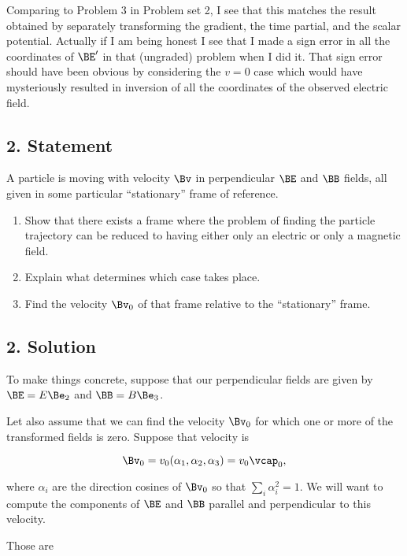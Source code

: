 Comparing to Problem 3 in Problem set 2, I see that this matches the result obtained by separately transforming the gradient, the time partial, and the scalar potential.  Actually if I am being honest I see that I made a sign error in all the coordinates of $\BE'$ in that (ungraded) problem when I did it.  That sign error should have been obvious by considering the $v=0$ case which would have mysteriously resulted in inversion of all the coordinates of the observed electric field.

\subsection{2. Statement}

A particle is moving with velocity $\Bv$ in perpendicular $\BE$ and $\BB$ fields, all given in some particular ``stationary'' frame of reference.

\begin{enumerate}
\item Show that there exists a frame where the problem of finding the particle trajectory can be reduced to having either only an electric or only a magnetic field.
\item Explain what determines which case takes place.
\item Find the velocity $\Bv_0$ of that frame relative to the ``stationary'' frame.
\end{enumerate}

\subsection{2. Solution}

To make things concrete, suppose that our perpendicular fields are given by $\BE = E \Be_2$ and $\BB = B \Be_3$.

Let also assume that we can find the velocity $\Bv_0$ for which one or more of the transformed fields is zero.  Suppose that velocity is

\begin{equation}\label{eqn:relElectroDynProblemSet3:1480}
\Bv_0 = v_0 (\alpha_1, \alpha_2, \alpha_3) = v_0 \vcap_0,
\end{equation}

where $\alpha_i$ are the direction cosines of $\Bv_0$ so that $\sum_i \alpha_i^2 = 1$.  We will want to compute the components of $\BE$ and $\BB$ parallel and perpendicular to this velocity.

Those are

